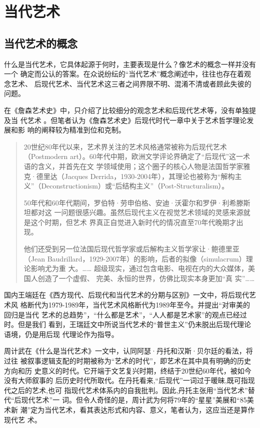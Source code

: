 \chapter{当代艺术}

\section{当代艺术的概念}

什么是当代艺术，它具体起源于何时，主要表现是什么？像艺术的概念一样并没有一个
确定而公认的答案。在众说纷纭的“当代艺术”概念阐述中，往往也存在着观念艺术、
后现代艺术、当代艺术这三者之间界限不明、混淆不清或者顾此失彼的问题。

在《詹森艺术史》中，只介绍了比较细分的观念艺术和后现代艺术等，没有单独提及当
代艺术 。但笔者认为《詹森艺术史》后现代时代一章中关于艺术哲学理论发展和影
响的阐释较为精准到位和克制。

\begin{quotation}
  20世纪80年代以来，艺术界关注的艺术风格通常被称为后现代艺术（Postmodern
  art）。60年代中期，欧洲文学评论界确定了“后现代”这一术语的含义，并首先在文
  学领域使用；这个圈子的核心人物是法国哲学家雅克·德里达（Jacques
  Derrida，1930-2004年），其理论也被称为“解构主
  义”（Deconstructionism）或“后结构主义”（Post-Structuralism）。\medskip

  50年代和60年代期间，罗伯特·劳申伯格、安迪·沃霍尔和罗伊·利希滕斯坦都对这
  一问题很感兴趣。虽然后现代主义在视觉艺术领域的灵感来源就是这个时期，但艺术
  界真正自觉进入新时代的情况直至70年代晚期才出
  现。\cite[1077]{9787510048623}\medskip

  他们还受到另一位法国后现代哲学家或后解构主义哲学家让·鲍德里亚（Jean
  Baudrillard，1929-2007年）的影响，后者的拟像（simulacrum）理论影响尤为重
  大。…… 超级现实，通过包含电影、电视在内的大众媒体，美国人创造了一个虚假、
  完美、永恒的世界，仿佛比现实本身更加“真
  实”……\cite[1094]{9787510048623}
\end{quotation}

国内王端廷在《西方现代、后现代和当代艺术的分期与区别》一文中，将后现代艺术风
格断代为1979-1989年，当代艺术风格断代为1989年至今。并提出“对审美的回归是当代
艺术的总趋势”，“什么都是艺术”，“人人都是艺术家”的观点已经过时。但是我们
看到，王瑞廷文中所说当代艺术的“普世主义”仍未脱出后现代理论语境，仍是用后现
代理论作为指导。\cite{wangduanting}

周计武在《什么是当代艺术》一文中，认同阿瑟·丹托和汉斯·贝尔廷的看法，将过往
被叙事逻辑支配的时期被称为“艺术的时代”，即艺术在其中具有明确的历史方向和历
史意义的时代。它开端于文艺复兴时期，终结于20世纪60年代，被如今没有大师叙事的
后历史时代所取代。在丹托看来,“后现代”一词过于暖昧,既可指现代之后的艺术,也可
指现代艺术体系内的自我批判。因此,丹托主张用“当代艺术”替代“后现代艺术”一
词。\cite{whatsart}但令人奇怪的是，周计武为何将79年的“星星”美展和“85美术新
潮”定为当代艺术，看其表达形式和内容、意义，笔者认为，这应当还是算作现代艺
术。

